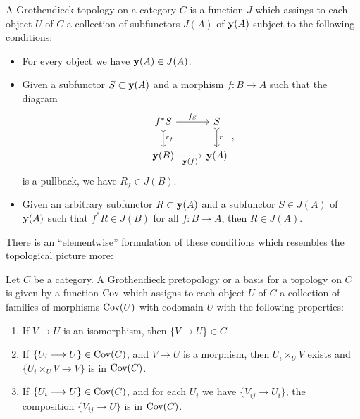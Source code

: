 \begin{definition}
	A Grothendieck topology on a category $C$ is a function $J$ which assings to each object $U$ of $C$ a collection of subfunctors $J(A)$ of $\mathbf{y}(A)$ subject to the following conditions:
	\begin{itemize}
		\item For every object we have $\mathbf{y}(A) \in J(A)$.
		\item
		      Given a subfunctor $S \subset \mathbf{y}(A)$ and a morphism $f \colon B \to A$ such that the diagram
		      \[
			      \begin{tikzcd}
				      f^*S       & S \\
				      {\yo(B)} & {\yo(A)}
				      \arrow["f_S"    ,       from=1-1, to=1-2]
				      \arrow["r"      , tail, from=1-2, to=2-2]
				      \arrow["r_f"    , tail, from=1-1, to=2-1]
				      \arrow["\yo(f)"',       from=2-1, to=2-2]
			      \end{tikzcd},
		      \]
		      is a pullback, we have $R_f \in J(B)$.
		\item Given an arbitrary subfunctor $R \subset \mathbf{y}(A)$ and a subfunctor $S \in J(A)$ of $\mathbf{y}(A)$ such that $f^*R \in J(B)$ for all $f \colon B \to A$, then $R \in J(A)$.
	\end{itemize}

	There is an ``elementwise'' formulation of these conditions which resembles the topological picture more:

	\begin{definition}
		Let $C$ be a category. A Grothendieck pretopology or a basis for a topology on $C$ is given by a function $\text{Cov}$ which assigns to each object $U$ of $C$ a collection of families of morphisms $\text{Cov}(U)$ with codomain $U$ with the following properties:
		\begin{enumerate}
			\item If $V \to U$ is an isomorphism, then $\{V \to U\} \in C$
			\item If $\{U_i \longrightarrow U\} \in \text{Cov}(C)$, and $V \to U$ is a morphism, then $U_i \times_U V$ exists and $\{U_i \times_U V \to V\}$ is in $\text{Cov}(C)$.
			\item If $\{U_i \longrightarrow U\} \in \text{Cov}(C)$, and for each $U_i$ we have $\{V_{ij} \to U_i\}$, the composition $\{V_{ij} \to U\}$ is in $\text{Cov}(C)$.
		\end{enumerate}
	\end{definition}
\end{definition}


